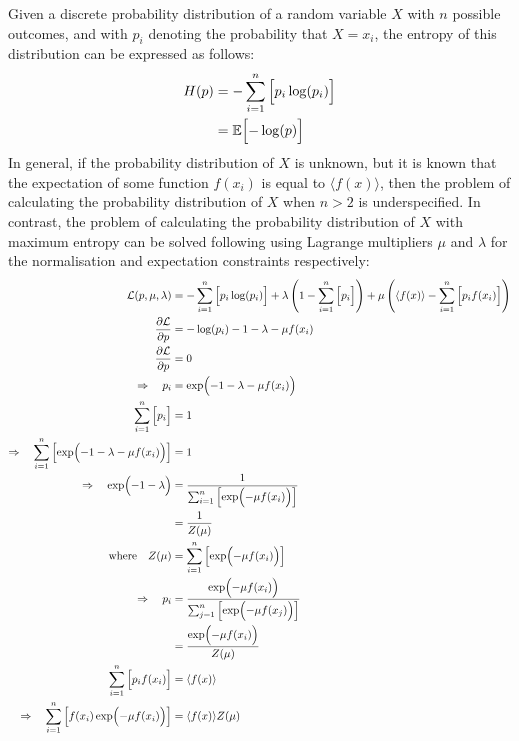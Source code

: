 Given a discrete probability distribution of a random variable $X$ with $n$ possible outcomes, and with $p_i$ denoting the probability that $X=x_i$, the entropy of this distribution can be expressed as follows:
\begin{align*}
    H(p) &= -\sum_{i=1}^n{\Bigl[ p_i \log(p_i) \Bigr]} \\
    &= \mathbb{E} \Bigl[ -\log(p) \Bigr]
\end{align*}
In general, if the probability distribution of $X$ is unknown, but it is known that the expectation of some function $f(x_i)$ is equal to $\langle f(x)\rangle$, then the problem of calculating the probability distribution of $X$ when $n>2$ is underspecified. In contrast, the problem of calculating the probability distribution of $X$ with maximum entropy can be solved following \cite{jaynes1957information} using Lagrange multipliers $\mu$ and $\lambda$ for the normalisation and expectation constraints respectively:
\begin{align*}
    \mathcal{L}(p,\mu,\lambda) &= -\sum_{i=1}^n{\Bigl[ p_i \log(p_i) \Bigr]} + \lambda \left( 1 - \sum_{i=1}^n{\Bigl[ p_i \Bigr]} \right) + \mu \left( \langle f(x)\rangle - \sum_{i=1}^n{\Bigl[ p_i f(x_i) \Bigr]} \right) \\
    \frac{\partial\mathcal{L}}{\partial p} &= -\log(p_i) - 1 - \lambda - \mu f(x_i) \\
    \frac{\partial\mathcal{L}}{\partial p} &= 0 \\
    \Rightarrow \quad p_i &= \exp\Bigl( - 1 - \lambda - \mu f(x_i) \Bigr) \\
    \sum_{i=1}^n{\Bigl[ p_i \Bigr]} &= 1 \\
    \Rightarrow \quad \sum_{i=1}^n{\Bigl[ \exp\Bigl( - 1 - \lambda - \mu f(x_i) \Bigr) \Bigr]} &= 1 \\
    \Rightarrow \quad \exp\Bigl( - 1 - \lambda \Bigr) &= \frac{1}{\sum_{i=1}^n{\Bigl[ \exp\Bigl( -\mu f(x_i) \Bigr) \Bigr]}} \\
    &= \frac{1}{Z(\mu)} \\
    \text{where} \quad Z(\mu) &= \sum_{i=1}^n{\Bigl[ \exp\Bigl( -\mu f(x_i) \Bigr) \Bigr]} \\
    \Rightarrow \quad p_i &= \frac{\exp\Bigl( -\mu f(x_i) \Bigr)}{\sum_{j=1}^n{\Bigl[ \exp\Bigl( -\mu f(x_j) \Bigr) \Bigr]}} \\
    &= \frac{\exp\Bigl( -\mu f(x_i) \Bigr)}{Z(\mu)} \\
    \sum_{i=1}^n{\Bigl[ p_i f(x_i) \Bigr]} &= \langle f(x)\rangle \\
    \Rightarrow \quad \sum_{i=1}^n{\Bigl[ f(x_i) \exp\Bigl( -\mu f(x_i) \Bigr) \Bigr]} &= \langle f(x)\rangle Z(\mu)
\end{align*}
